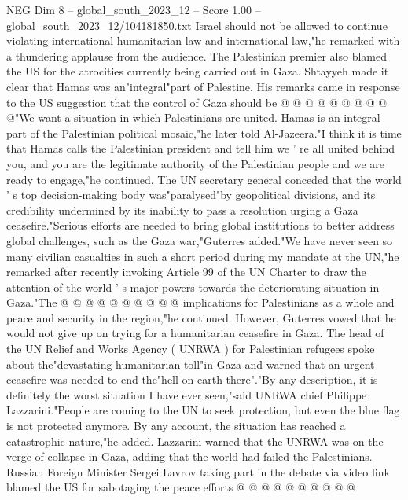 \begin{textsample}{NEG Dim 8 – global\_south\_2023\_12 – Score 1.00 – global\_south\_2023\_12/104181850.txt}
Israel should not be allowed to continue violating international humanitarian law and international law,"he remarked with a thundering applause from the audience.
The Palestinian premier also blamed the US for the atrocities currently being carried out in Gaza.
Shtayyeh made it clear that Hamas was an"integral"part of Palestine.
His remarks came in response to the US suggestion that the control of Gaza should be @ @ @ @ @ @ @ @ @ @"We want a situation in which Palestinians are united.
Hamas is an integral part of the Palestinian political mosaic,"he later told Al-Jazeera."I think it is time that Hamas calls the Palestinian president and tell him we ' re all united behind you, and you are the legitimate authority of the Palestinian people and we are ready to engage,"he continued.
The UN secretary general conceded that the world ' s top decision-making body was"paralysed"by geopolitical divisions, and its credibility undermined by its inability to pass a resolution urging a Gaza ceasefire."Serious efforts are needed to bring global institutions to better address global challenges, such as the Gaza war,"Guterres added."We have never seen so many civilian casualties in such a short period during my mandate at the UN,"he remarked after recently invoking Article 99 of the UN Charter to draw the attention of the world ' s major powers towards the deteriorating situation in Gaza."The @ @ @ @ @ @ @ @ @ @ implications for Palestinians as a whole and peace and security in the region,"he continued.
However, Guterres vowed that he would not give up on trying for a humanitarian ceasefire in Gaza.
The head of the UN Relief and Works Agency ( UNRWA ) for Palestinian refugees spoke about the"devastating humanitarian toll"in Gaza and warned that an urgent ceasefire was needed to end the"hell on earth there"."By any description, it is definitely the worst situation I have ever seen,"said UNRWA chief Philippe Lazzarini."People are coming to the UN to seek protection, but even the blue flag is not protected anymore.
By any account, the situation has reached a catastrophic nature,"he added.
Lazzarini warned that the UNRWA was on the verge of collapse in Gaza, adding that the world had failed the Palestinians.
Russian Foreign Minister Sergei Lavrov taking part in the debate via video link blamed the US for sabotaging the peace efforts @ @ @ @ @ @ @ @ @ @

\end{textsample}
